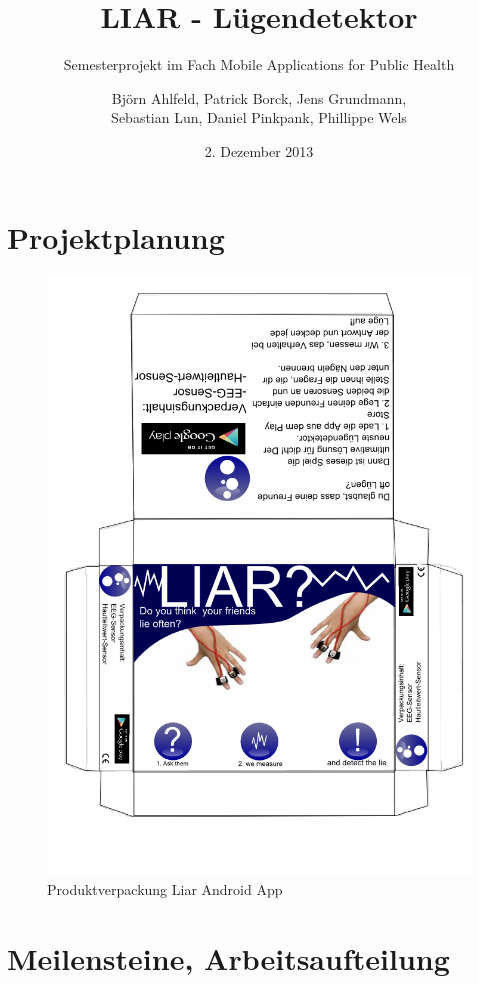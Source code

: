 \documentclass[10pt, a4paper, oneside, titlepage]{scrartcl} %
\date{2. Dezember 2013}
\author{Björn Ahlfeld, Patrick Borck, Jens Grundmann,\\ Sebastian Lun, Daniel Pinkpank, Phillippe Wels}
\title{LIAR - Lügendetektor}
\subtitle{Semesterprojekt im Fach Mobile Applications for Public Health}
\begin{document}
   	\maketitle
   	\thispagestyle{empty}
	\tableofcontents
	\listoffigures
	\listoftables
   	\newpage
   	\section{Projektplanung}
   
   \begin{figure}[h!]
	\begin{center}
		\includegraphics[width=14.0cm]{verpackung_bjoern.png}
	\end{center}
	\caption[Produktverpackung]{Produktverpackung Liar Android App}
	\label{fig:verpackung}
	\end{figure}

   	\section{Meilensteine, Arbeitsaufteilung}
   
\end{document}
